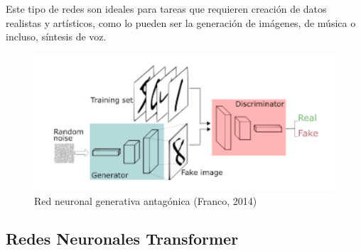 Este tipo de redes son ideales para tareas que requieren creación de datos realistas y artísticos, como lo pueden ser la generación de imágenes, de música o incluso, síntesis de voz. 

\begin{figure}[h]
	\centering
	\includegraphics[width = 1 \textwidth]{Imagenes/Vectorial/gan.png}
	\caption{Red neuronal generativa antagónica (Franco, 2014)}
	\label{fig:gan}
\end{figure}


\subsection{Redes Neuronales Transformer}

